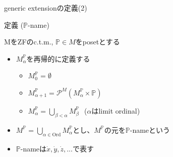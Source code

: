 \documentclass[17pt,aspectratio=169]{beamer}
\newcommand{\Pbb}{\mathbb{P}}
\begin{document}
\begin{frame}{generic extensionの定義(2)}
    \vspace{-5pt}
    \begin{itembox}[l]{定義 ($\Pbb$-name)}
        {\small
            \vspace{-5pt}
            MをZFのc.t.m., $\Pbb \in M$をposetとする
            \vspace{-8pt}
            \begin{itemize}[itemsep=1pt] 
                \item $M^{\Pbb}_{\alpha}$を再帰的に定義する 
                    \begin{itemize}
                       \item $M^{\Pbb}_0 = \emptyset$ 
                       \item  $M^{\Pbb}_{\alpha+1} = \mathcal{P}^M(M^{\Pbb}_{\alpha} \times \Pbb)$ 
                       \item  $M^{\Pbb}_{\alpha} = \bigcup_{\beta < \alpha} M^{\Pbb}_{\beta}$\,\,\,\,($\alpha$はlimit ordinal)
                    \end{itemize}
                \item $M^{\Pbb} = \bigcup_{\alpha \in \text{Ord}} M^{\Pbb}_{\alpha}$とし、$M^{\Pbb}$の元を$\Pbb$-nameという
                \item $\Pbb$-nameは$\dot{x}, \dot{y}, \dot{z}, ...$で表す
            \end{itemize}            
        }
    \end{itembox}
\end{frame}
\end{document}
